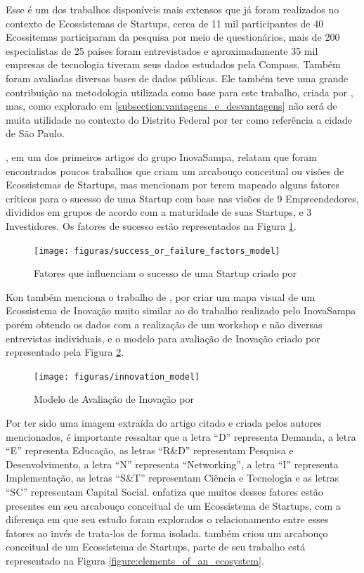 Esse é um dos trabalhos disponíveis mais extensos que já foram realizados no contexto de Ecossistemas de Startups, cerca de 11 mil participantes de 40 Ecossitemas participaram da pesquisa por meio de questionários, mais de 200 especialistas de 25 países foram entrevistados e aproximadamente 35 mil empresas de tecnologia tiveram seus dados estudados pela Compass. Também foram avaliadas diversas bases de dados públicas. Ele também teve uma grande contribuição na metodologia utilizada como base para este trabalho, criada por , mas, como explorado em \ref{subsection:vantagens_e_desvantagens} não será de muita utilidade no contexto do Distrito Federal por ter como referência a cidade de São Paulo.

, em um dos primeiros artigos do grupo InovaSampa, relatam que foram encontrados poucos trabalhos que criam um arcabouço conceitual ou visões de Ecossistemas de Startups, mas mencionam  por terem mapeado alguns fatores críticos para o sucesso de uma Startup com base nas visões de 9 Empreendedores, divididos em grupos de acordo com a maturidade de suas Startups, e 3 Investidores. Os fatores de sucesso estão representados na Figura \ref{figure:success_or_failure_factors_model}.

\begin{figure}[!htb]
\centering
\texttt{[image: figuras/success\_or\_failure\_factors\_model]}
\caption{Fatores que influenciam o sucesso de uma Startup criado por }
\label{figure:success_or_failure_factors_model}
\end{figure}

Kon também menciona o trabalho de , por criar um mapa visual de um Ecossistema de Inovação muito similar ao do trabalho realizado pelo InovaSampa porém obtendo os dados com a realização de um workshop e não diversas entrevistas individuais, e o modelo para avaliação de Inovação criado por  representado pela Figura \ref{figure:innovation_model}. 

\begin{figure}[!htb]
\centering
\texttt{[image: figuras/innovation\_model]}
\caption{Modelo de Avaliação de Inovação por }
\label{figure:innovation_model}
\end{figure}

Por ter sido uma imagem extraída do artigo citado e criada pelos autores mencionados, é importante ressaltar que a letra ``D'' representa Demanda, a letra ``E'' representa Educação, as letras ``R\&D'' representam Pesquisa e Desenvolvimento, a letra ``N'' representa ``Networking'', a letra ``I'' representa Implementação, as letras ``S\&T'' representam Ciência e Tecnologia e as letras ``SC'' representam Capital Social.  enfatiza que muitos desses fatores estão presentes em seu arcabouço conceitual de um Ecossistema de Startups, com a diferença em que seu estudo foram explorados o relacionamento entre esses fatores ao invés de trata-los de forma isolada.  também criou um arcabouço conceitual de um Ecossistema de Startups, parte de seu trabalho está representado na Figura \ref{figure:elements_of_an_ecosystem}.

